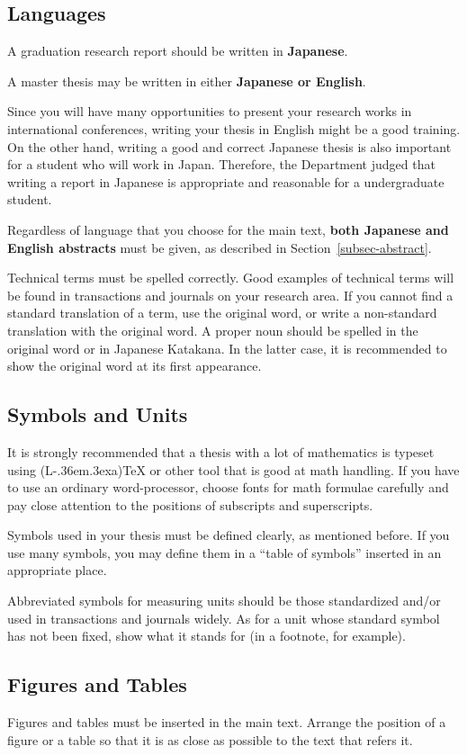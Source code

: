 \documentclass[master,english]{kuisthesis}
\def\LATEX{{\rm (L\kern-.36em\raise.3ex\hbox{\sc a})\TeX}}
\let\EM\bf
\begin{document}
\subsection{Languages}\label{subsec-language}
A graduation research report should be written in {\EM Japanese}.

A master thesis may be written in either {\EM Japanese or English}.

Since you will have many opportunities to present your research works in
international conferences, writing your thesis in English might be a good
training.  On the other hand, writing a good and correct Japanese thesis is
also important for a student who will work in Japan.  Therefore, the
Department judged that writing a report in Japanese is appropriate and
reasonable for a undergraduate student.

Regardless of language that you choose for the main text, {\EM both
Japanese and English abstracts} must be given, as described in
Section~\ref{subsec-abstract}.

Technical terms must be spelled correctly.  Good examples of technical terms
will be found in transactions and journals on your research area.  If you
cannot find a standard translation of a term, use the original word, or
write a non-standard translation with the original word.  A proper noun
should be spelled in the original word or in Japanese Katakana.  In the
latter case, it is recommended to show the original word at its first
appearance.

\subsection{Symbols and Units}\label{subsec-symbol}
It is strongly recommended that a thesis with a lot of mathematics is
typeset using \LATEX{} or other tool that is good at math handling.  If
you have to use an ordinary word-processor, choose fonts for math formulae
carefully and pay close attention to the positions of subscripts and
superscripts.

Symbols used in your thesis must be defined clearly, as mentioned before.
If you use many symbols, you may define them in a ``table of symbols''
inserted in an appropriate place.

Abbreviated symbols for measuring units should be those standardized
and\slash or used in transactions and journals widely.  As for a unit whose
standard symbol has not been fixed, show what it stands for (in a footnote,
for example).

\subsection{Figures and Tables}\label{subsec-figure}
Figures and tables must be inserted in the main text.  Arrange the position
of a figure or a table so that it is as close as possible to the text that
refers it.
\end{document}
